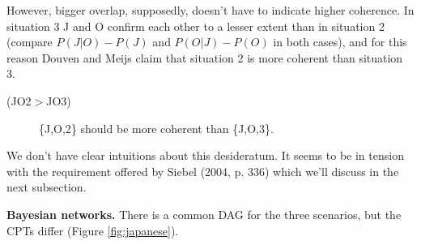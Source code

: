 \documentclass[
  10pt,
]{scrartcl}
\newcommand{\s}[1]{\textsf{#1}}
\begin{document}
However, bigger overlap, supposedly, doesn't have to indicate higher coherence. In situation 3 \s{J} and \s{O} confirm each other to a lesser extent than in situation 2 (compare \(P(J|O)-P(J)\) and \(P(O|J)-P(O)\) in both cases), and for this reason Douven and Meijs claim that situation 2 is more coherent than situation 3.
\vspace{2mm}

\begin{description}
    \item[(\s{JO2}$>$\s{JO3})]  \{\s{J,O,2}\} should be more coherent than \{\s{J,O,3}\}.
\end{description}\vspace{2mm}

\noindent We don't have clear intuitions about this desideratum. It seems to be in tension with the requirement offered by Siebel (2004, p. 336) which we'll discuss in the next subsection.

\textbf{Bayesian networks.} There is a common DAG for the three scenarios, but the CPTs differ (Figure \ref{fig:japanese}).
\end{document}
